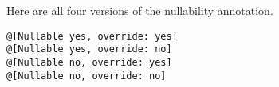 \example Here are all four versions of the nullability annotation. 
\begin{lstlisting}[deletekeywords={override}]
@[Nullable yes, override: yes]
@[Nullable yes, override: no]
@[Nullable no, override: yes]
@[Nullable no, override: no]
\end{lstlisting}




